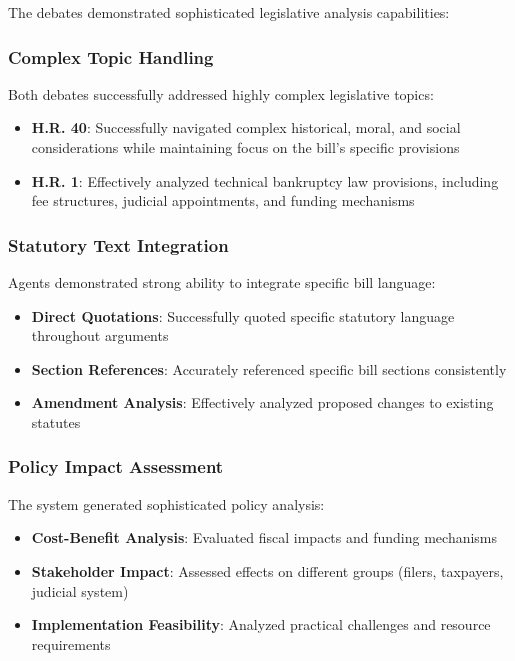 \documentclass{article}
\begin{document}
The debates demonstrated sophisticated legislative analysis capabilities:

\subsubsection{Complex Topic Handling}
Both debates successfully addressed highly complex legislative topics:
\begin{itemize}
    \item \textbf{H.R. 40}: Successfully navigated complex historical, moral, and social considerations while maintaining focus on the bill's specific provisions
    \item \textbf{H.R. 1}: Effectively analyzed technical bankruptcy law provisions, including fee structures, judicial appointments, and funding mechanisms
\end{itemize}

\subsubsection{Statutory Text Integration}
Agents demonstrated strong ability to integrate specific bill language:
\begin{itemize}
    \item \textbf{Direct Quotations}: Successfully quoted specific statutory language throughout arguments
    \item \textbf{Section References}: Accurately referenced specific bill sections consistently
    \item \textbf{Amendment Analysis}: Effectively analyzed proposed changes to existing statutes
\end{itemize}

\subsubsection{Policy Impact Assessment}
The system generated sophisticated policy analysis:
\begin{itemize}
    \item \textbf{Cost-Benefit Analysis}: Evaluated fiscal impacts and funding mechanisms
    \item \textbf{Stakeholder Impact}: Assessed effects on different groups (filers, taxpayers, judicial system)
    \item \textbf{Implementation Feasibility}: Analyzed practical challenges and resource requirements
\end{itemize}
\end{document}
